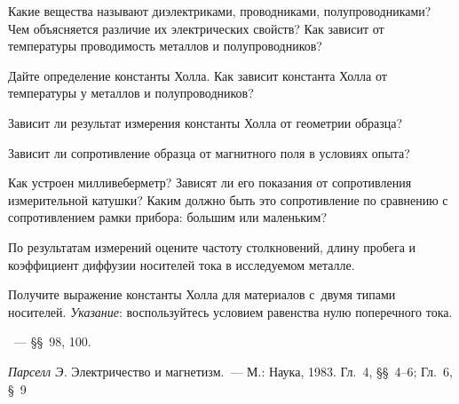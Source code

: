 \begin{lab:questions}

\item Какие вещества называют диэлектриками, проводниками, полупроводниками?
Чем объясняется различие их электрических свойств? Как зависит от температуры
проводимость металлов и полупроводников?

\item Дайте определение константы Холла. Как зависит константа Холла от
температуры у металлов и полупроводников?

\item Зависит ли результат измерения константы Холла от геометрии образца?

\item Зависит ли сопротивление образца от магнитного поля 
в условиях опыта?

\item Как устроен милливеберметр? Зависят ли его показания от сопротивления
измерительной катушки? Каким должно быть это сопротивление по сравнению с
сопротивлением рамки прибора: большим или маленьким?

\item По результатам измерений оцените частоту столкновений,
длину пробега и коэффициент диффузии носителей тока в исследуемом металле.

\item Получите выражение константы Холла для материалов с~двумя типами
носителей. \emph{Указание}: воспользуйтесь условием равенства нулю поперечного тока.

\end{lab:questions}

\begin{lab:literature}

\item \SivuhinIII~--- \S\S~98, 100.

\item \emph{Парселл Э.} Электричество и магнетизм.~--- М.: Наука, 1983. Гл.~4,
\S\S~4--6; Гл.~6, \S~9

\end{lab:literature}

